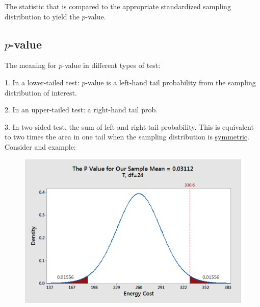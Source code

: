 \documentclass[12pt]{article}
\begin{document}
The statistic that is compared to the appropriate standardized
sampling distribution to yield the $ p $-value.


\subsection{$ p $-value}

The meaning for $ p $-value in different types of test:

1. In a lower-tailed test: $ p $-value is a left-hand tail probability
from the sampling distribution of interest.

2. In an upper-tailed test: a right-hand tail prob. 

3. In two-sided test, the sum of left and right tail probability.
This is equivalent to two times the area in one tail when the
sampling distribution is {\underline {symmetric}}.\\




Consider and example:


\begin{figure}[H]
		{\includegraphics[scale =.5 ]  {figures/pvalue_against_CI.png}}
\end{figure}
\end{document}
